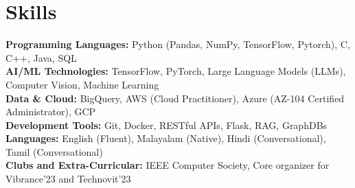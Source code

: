 \documentclass[11pt]{article}       %
\begin{document}
\section*{Skills}
\textbf{Programming Languages:} Python (Pandas, NumPy, TensorFlow, Pytorch), C, C++, Java, SQL \\
\textbf{AI/ML Technologies:} TensorFlow, PyTorch, Large Language Models (LLMs), Computer Vision, Machine Learning \\
\textbf{Data \& Cloud:} BigQuery, AWS (Cloud Practitioner), Azure (AZ-104 Certified Administrator), GCP \\
\textbf{Development Tools:} Git, Docker, RESTful APIs, Flask, RAG, GraphDBs \\
\textbf{Languages:} English (Fluent), Malayalam (Native), Hindi (Conversational), Tamil (Conversational) \\
\textbf{Clubs and Extra-Curricular:} IEEE Computer Society, Core organizer for Vibrance'23 and Technovit'23
\end{document}
